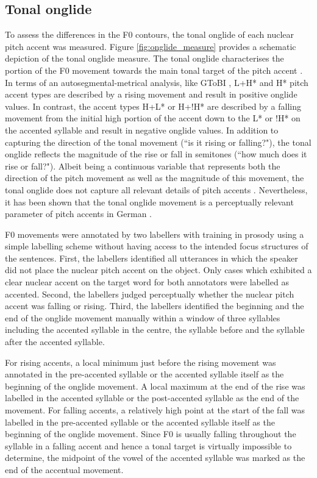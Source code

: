 \subsection{Tonal onglide}

To assess the differences in the F0 contours, the tonal onglide of each nuclear pitch accent was measured. Figure \ref{fig:onglide_measure} provides a schematic depiction of the tonal onglide measure. The tonal onglide characterises the portion of the F0 movement towards the main tonal target of the pitch accent \citep{RitterGrice2015}. In terms of an autosegmental-metrical analysis, like GToBI \citep{GriceBaumannBenzmüller2005}, L+H* and H* pitch accent types are described by a rising movement and result in positive onglide values. In contrast, the accent types H+L* or H+!H* are described by a falling movement from the initial high portion of the accent down to the L* or !H* on the accented syllable and result in negative onglide values. In addition to capturing the direction of the tonal movement (``is it rising or falling?"), the tonal onglide reflects the magnitude of the rise or fall in semitones (``how much does it rise or fall?"). Albeit being a continuous variable that represents both the direction of the pitch movement as well as the magnitude of this movement, the tonal onglide does not capture all relevant details of pitch accents \citep{Griceetal2017}. Nevertheless, it has been shown that the tonal onglide movement is a perceptually relevant parameter of pitch accents in German \citep{BaumannRöhr2015, RitterGrice2015}.

F0 movements were annotated by two labellers with training in prosody using a simple labelling scheme without having access to the intended focus structures of the sentences. First, the labellers identified all utterances in which the speaker did not place the nuclear pitch accent on the object. Only cases which exhibited a clear nuclear accent on the target word for both annotators were labelled as accented. Second, the labellers judged perceptually whether the nuclear pitch accent was falling or rising. Third, the labellers identified the beginning and the end of the onglide movement manually within a window of three syllables including the accented syllable in the centre, the syllable before and the syllable after the accented syllable.

For rising accents, a local minimum just before the rising movement was annotated in the pre-accented syllable or the accented syllable itself as the beginning of the onglide movement. A local maximum at the end of the rise was labelled in the accented syllable or the post-accented syllable as the end of the movement. For falling accents, a relatively high point at the start of the fall was labelled in the pre-accented syllable or the accented syllable itself as the beginning of the onglide movement. Since F0 is usually falling throughout the syllable in a falling accent and hence a tonal target is virtually impossible to determine, the midpoint of the vowel of the accented syllable was marked as the end of the accentual movement.

